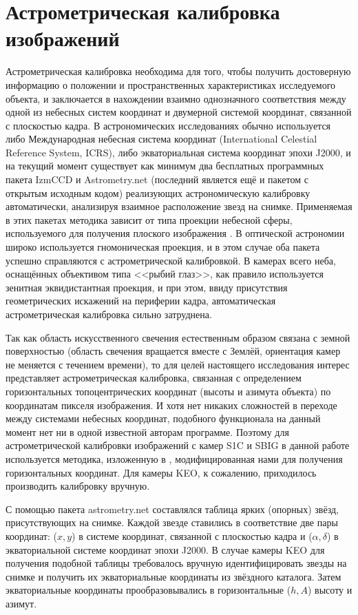 \documentclass[12pt,a4paper]{article}
\begin{document}
\section{Астрометрическая калибровка изображений} \label{sec:astro_cal}
Астрометрическая калибровка необходима для того, чтобы получить достоверную информацию о положении и пространственных характеристиках исследуемого объекта, и заключается в нахождении взаимно однозначного соответствия между одной из небесных систем координат и двумерной системой координат, связанной с плоскостью кадра. В астрономических исследованиях обычно используется либо Международная небесная система координат (International Celestial Reference System, ICRS), либо экваториальная система координат эпохи J2000, и на текущий момент существует как минимум два бесплатных программных пакета IzmCCD \cite{Izmccd,Izmailov2010} и Astrometry.net \cite{Astrometry.net, Lang2010} (последний является ещё и пакетом с открытым исходным кодом) реализующих астрономическую калибровку автоматически, анализируя взаимное расположение звезд на снимке. Применяемая в этих пакетах методика зависит от типа проекции небесной сферы, используемого для получения плоского изображения \cite{Calabretta2002}. В оптической астрономии широко используется гномоническая проекция, и в этом случае оба пакета успешно справляются с астрометрической калибровкой. В камерах всего неба, оснащённых объективом типа <<рыбий глаз>>, как правило используется зенитная эквидистантная проекция, и при этом, ввиду присутствия геометрических искажений на периферии кадра, автоматическая астрометрическая калибровка сильно затруднена.

Так как область искусственного свечения естественным образом связана с земной поверхностью (область свечения вращается вместе с Землёй, ориентация камер не меняется с течением времени), то для целей настоящего исследования интерес представляет астрометрическая калибровка, связанная с определением горизонтальных топоцентрических координат (высоты и азимута объекта) по координатам пикселя изображения. И хотя нет никаких сложностей в переходе между системами небесных координат, подобного функционала на данный момент нет ни в одной известной авторам программе. Поэтому для астрометрической калибровки изображений с камер S1C и SBIG в данной работе используется методика, изложенную в \cite{Montenbruck2000}, модифицированная нами для получения горизонтальных координат. Для камеры KEO, к сожалению, приходилось производить калибровку вручную.

С помощью пакета astrometry.net составлялся таблица ярких (опорных) звёзд, присутствующих на снимке. Каждой звезде ставились в соответствие две пары координат: ($x,y$) в системе координат, связанной с плоскостью кадра и ($\alpha, \delta$) в экваториальной системе координат эпохи J2000. В случае камеры KEO для получения подобной таблицы требовалось вручную идентифицировать звезды на снимке и получить их экваториальные координаты из звёздного каталога. Затем экваториальные координаты прообразовывались в горизонтальные ($h,A$) высоту и азимут.
\end{document}

